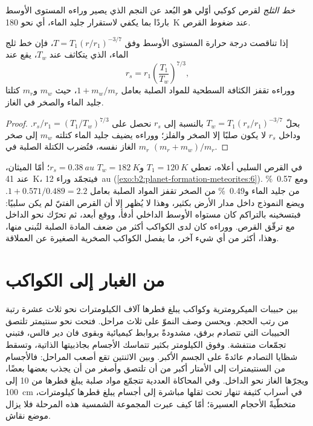 \begin{definition}[خط الثلج]\label{def:b2:planet-formation-meteorites:snow-line}
\emph{خط الثلج} لقرص كوكبي أوّلي هو البُعد
عن النجم الذي يصير وراءه المستوى الأوسط باردًا بما يكفي لاستقرار جليد الماء،
أي نحو \qty{180}{K} عند ضغوط القرص.
\end{definition}

\begin{proposition}
\label{prop:b2:planet-formation-meteorites:snow-line}
إذا تناقصت درجة حرارة المستوى الأوسط وفق $T = T_1 (r/r_1)^{-3/7}$، فإن خط ثلج
الماء، الذي يتكاثف عند $T_w$، يقع عند
\[
  r_s = r_1 \left(\frac{T_1}{T_w}\right)^{7/3},
\]
ووراءه تقفز الكثافة السطحية للمواد الصلبة بعامل $1 + m_w/m_r$،
حيث $m_w$ و$m_r$ كتلتا جليد الماء والصخر في الغاز.
\end{proposition}

\begin{proof}
بحلّ $T_w = T_1 (r_s/r_1)^{-3/7}$ بالنسبة إلى $r_s$ نحصل على
$r_s/r_1 = (T_1/T_w)^{7/3}$. وداخل $r_s$ لا يكون صلبًا إلا الصخر والفلز؛ ووراءه
يضيف جليد الماء كتلته $m_w$ إلى صخر $m_r$ الغاز نفسه، فتُضرب
الكتلة الصلبة في $(m_r + m_w)/m_r$.
\end{proof}

في القرص السلبي أعلاه، تعطي $T_1 = \qty{120}{K}$ و$T_w = \qty{182}{K}$
$r_s = \qty{0.38}{au}$؛ أمّا الميثان، عند \qty{41}{K}، فيتجمّد وراء \qty{12}{au}
(\cref{exo:b2:planet-formation-meteorites:6}). ومع \qty{0.57}{\percent} من جليد الماء و\qty{0.49}{\percent}
من الصخر تقفز المواد الصلبة بعامل $1 + 0.571/0.489 = 2.2$. ويضع
النموذج  داخل مدار الأرض بكثير، وهذا لا يُظهر إلا أن
القرص الفتيّ لم يكن سلبيًا: فبتسخينه بالتراكم كان مستواه الأوسط الداخلي أدفأ،
ووقع  أبعد، ثم تحرّك نحو الداخل مع ترقّق القرص. ووراءه
كان لدى الكواكب أكثر من ضعف المادة الصلبة لتُبنى منها، وهذا، أكثر من أي شيء آخر،
ما يفصل الكواكب الصخرية الصغيرة عن
العملاقة.

\section{من الغبار إلى الكواكب}

بين حبيبات  الميكرومترية وكواكب يبلغ قطرها آلاف
الكيلومترات نحو ثلاث عشرة رتبة من رتب الحجم. ويحسن وصف النموّ
على ثلاث مراحل. فتحت نحو سنتيمتر تلتصق الحبيبات التي تتصادم
برفق، مشدودةً بروابط كيميائية وبقوى فان دير فالس، فتبني تجمّعات
منتفشة. وفوق الكيلومتر بكثير تتماسك الأجسام بجاذبيتها الذاتية،
وتسقط شظايا التصادم عائدةً على الجسم الأكبر. وبين الاثنتين
تقع أصعب المراحل: فالأجسام من السنتيمترات إلى الأمتار أكبر من أن تلتصق
وأصغر من أن يجذب بعضها بعضًا، ويجرّها الغاز نحو الداخل. وفي
المحاكاة العددية تتجمّع مواد صلبة يبلغ قطرها من 10 إلى \qty{100}{cm} في أسراب
كثيفة تنهار تحت ثقلها مباشرة إلى أجسام يبلغ قطرها كيلومترات،
متخطّيةً الأحجام العسيرة؛ أمّا كيف عبرت المجموعة الشمسية هذه المرحلة
فلا يزال موضع نقاش.

